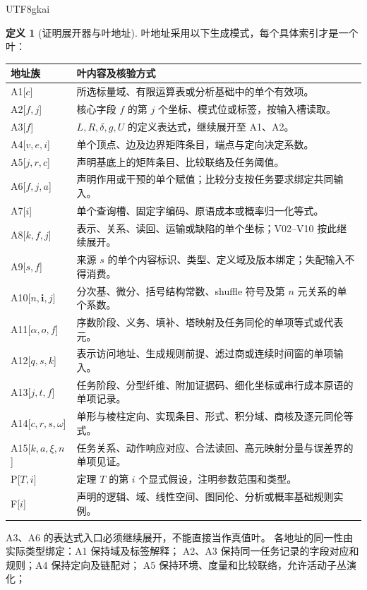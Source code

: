 \documentclass[12pt]{report}
\theoremstyle{definition}
\newtheorem{definition}{定义}[chapter]
\begin{document}
\begin{CJK*}{UTF8}{gkai}
\begin{definition}[证明展开器与叶地址]
叶地址采用以下生成模式，每个具体索引才是一个叶：
\begin{center}\small
\begin{tabular}{p{}p{}}
\toprule 地址族 & 叶内容及核验方式\\\midrule
A1[\(c\)] & 所选标量域、有限运算表或分析基础中的单个有效项。\\
A2[\(f,j\)] & 核心字段 \(f\) 的第 \(j\) 个坐标、模式位或标签，按输入槽读取。\\
A3[\(f\)] & \(L,R,\delta,g,U\) 的定义表达式，继续展开至 A1、A2。\\
A4[\(v,e,i\)] & 单个顶点、边及边界矩阵条目，端点与定向决定系数。\\
A5[\(j,r,c\)] & 声明基底上的矩阵条目、比较联络及任务阈值。\\
A6[\(f,j,a\)] & 声明作用或干预的单个赋值；比较分支按任务要求绑定共同输入。\\
A7[\(i\)] & 单个查询槽、固定字编码、原语成本或概率归一化等式。\\
A8[\(k,f,j\)] & 表示、关系、读回、运输或缺陷的单个坐标；V02--V10 按此继续展开。\\
A9[\(s,f\)] & 来源 \(s\) 的单个内容标识、类型、定义域及版本绑定；失配输入不得消费。\\
A10[\(n,\mathbf i,j\)] & 分次基、微分、括号结构常数、shuffle 符号及第 \(n\) 元关系的单个系数。\\
A11[\(\alpha,o,f\)] & 序数阶段、义务、填补、塔映射及任务同伦的单项等式或代表元。\\
A12[\(q,s,k\)] & 表示访问地址、生成规则前提、滤过商或连续时间窗的单项输入。\\
A13[\(j,t,f\)] & 任务阶段、分型纤维、附加证据码、细化坐标或串行成本原语的单项记录。\\
A14[\(c,r,s,\omega\)] & 单形与棱柱定向、实现条目、形式、积分域、商核及逐元同伦等式。\\
A15[\(k,a,\xi,n\)] & 任务关系、动作响应对应、合法读回、高元映射分量与误差界的单项见证。\\
P[\(T,i\)] & 定理 \(T\) 的第 \(i\) 个显式假设，注明参数范围和类型。\\
F[\(i\)] & 声明的逻辑、域、线性空间、图同伦、分析或概率基础规则实例。\\
\bottomrule
\end{tabular}
\end{center}
A3、A6 的表达式入口必须继续展开，不能直接当作真值叶。
各地址的同一性由实际类型绑定：A1 保持域及标签解释；
A2、A3 保持同一任务记录的字段对应和规则；A4 保持定向及链配对；
A5 保持环境、度量和比较联络，允许活动子丛演化；

\end{definition}
\end{CJK*}
\end{document}
